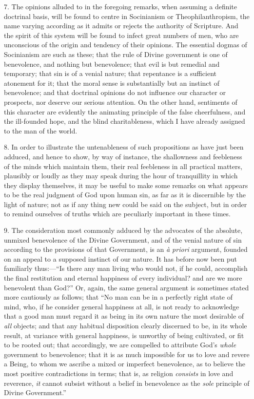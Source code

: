 7. The opinions alluded to in the foregoing remarks, when assuming
a definite doctrinal basis, will be found to centre in Socinianism or
Theophilanthropism, the name varying according as it admits or rejects
the authority of Scripture. And the spirit of this system will be
found to infect great numbers of men, who are unconscious of the
origin and tendency of their opinions. The essential dogmas of
Socinianism are such as these; that the rule of Divine government is
one of benevolence, and nothing but benevolence; that evil is but
remedial and temporary; that sin is of a venial nature; that
repentance is a sufficient atonement for it; that the moral sense is
substantially but an instinct of benevolence; and that doctrinal
opinions do not influence our character or prospects, nor deserve our
serious attention. On the other hand, sentiments of this character are
evidently the animating principle of the false cheerfulness, and the
ill-founded hope, and the blind charitableness, which I have already
assigned to the man of the world.

8. In order to illustrate the untenableness of such propositions as
have just been adduced, and hence to show, by way of instance, the
shallowness and feebleness of the minds which maintain them, their
real feebleness in all practical matters, plausibly or loudly as they
may speak during the hour of tranquillity in which they display
themselves, it may be useful to make some remarks on what appears to
be the real judgment of God upon human sin, as far as it is
discernible by the light of nature; not as if any thing new could be
said on the subject, but in order to remind ourselves of truths which
are peculiarly important in these times.

9. The consideration most commonly adduced by the advocates of the
absolute, unmixed benevolence of the Divine Government, and of the
venial nature of sin according to the provisions of that Government,
is an \emph{à priori} argument, founded on an appeal to a supposed
instinct of our nature. It has before now been put familiarly thus:—``Is
there any man living who would not, if he could, accomplish the final
restitution and eternal happiness of every individual? and are we more
benevolent than God?'' Or, again, the same general argument is
sometimes stated more cautiously as follows; that ``No man can be
in a perfectly right state of mind, who, if he consider general
happiness at all, is not ready to acknowledge that a good man must
regard it as being in its own nature the most desirable of \emph{all}
objects; and that any habitual disposition clearly discerned to be, in
its whole result, at variance with general happiness, is unworthy of
being cultivated, or fit to be rooted out; that accordingly, we are
compelled to attribute God's \emph{whole} government to benevolence;
that it is as much impossible for us to love and revere a Being, to
whom we ascribe a mixed or imperfect benevolence, as to believe the
most positive contradictions in terms; that is, as religion \emph{consists}
in love and reverence, \emph{it} cannot subsist without a belief in
benevolence as the \emph{sole} principle of Divine Government.''

